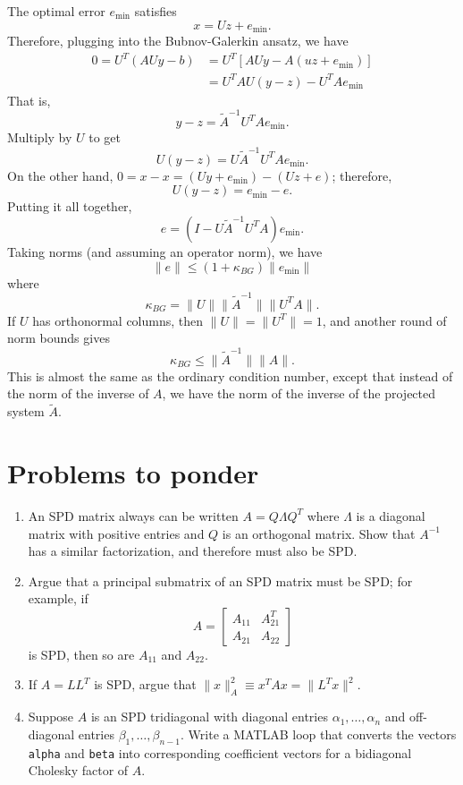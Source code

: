 \documentclass[12pt, leqno]{article}
\begin{document}
The optimal error $e_{\min}$ satisfies
\[
  x = Uz + e_{\min}.
\]
Therefore, plugging into the Bubnov-Galerkin ansatz, we have
\begin{align*}
0 = U^T (AUy-b)
&= U^T \left[ AUy - A(uz+e_{\min}) \right] \\
&= U^T A U (y-z) - U^T A e_{\min}
\end{align*}
That is,
\[
  y-z = \tilde{A}^{-1} U^T A e_{\min}.
\]
Multiply by $U$ to get
\[
  U(y-z) = U \tilde{A}^{-1} U^T A e_{\min}.
\]
On the other hand, $0 = x-x = (Uy+e_{\min})-(Uz+e)$; therefore,
\[
  U(y-z) = e_{\min}-e.
\]
Putting it all together,
\[
  e = (I-U \tilde{A}^{-1} U^T A) e_{\min}.
\]
Taking norms (and assuming an operator norm), we have
\[
  \|e\| \leq (1 + \kappa_{BG}) \|e_{\min}\|
\]
where
\[
  \kappa_{BG} = \|U\| \|\tilde{A}^{-1}\| \|U^T A\|.
\]
If $U$ has orthonormal columns, then $\|U\| = \|U^T\| = 1$, and
another round of norm bounds gives
\[
  \kappa_{BG} \leq \|\tilde{A}^{-1}\| \|A\|.
\]
This is almost the same as the ordinary condition number, except
that instead of the norm of the inverse of $A$, we have the norm
of the inverse of the projected system $\tilde{A}$.

\newpage
\section{Problems to ponder}

\begin{enumerate}
\item
  An SPD matrix always can be written $A = Q \Lambda Q^T$ where
  $\Lambda$ is a diagonal matrix with positive entries and $Q$ is
  an orthogonal matrix.  Show that $A^{-1}$ has a similar
  factorization, and therefore must also be SPD.
\item
  Argue that a principal submatrix of an SPD matrix must be SPD;
  for example, if
  \[
    A = \begin{bmatrix} A_{11} & A_{21}^T \\ A_{21} & A_{22} \end{bmatrix}
  \]
  is SPD, then so are $A_{11}$ and $A_{22}$.
\item
  If $A = LL^T$ is SPD, argue that
  $\|x\|_A^2 \equiv x^T A x = \|L^T x\|^2$.
\item
  Suppose $A$ is an SPD tridiagonal with diagonal entries
  $\alpha_{1}, \ldots, \alpha_n$ and off-diagonal entries
  $\beta_1, \ldots, \beta_{n-1}$.  Write a MATLAB loop that converts
  the vectors {\tt alpha} and {\tt beta} into corresponding
  coefficient vectors for a bidiagonal Cholesky factor of $A$.
\end{enumerate}
\end{document}
